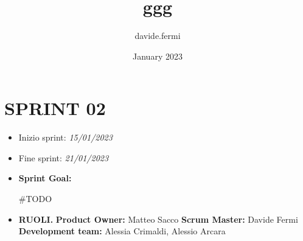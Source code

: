 \documentclass{article}
\title{ggg}
\author{davide.fermi }
\date{January 2023}
\begin{document}
    \maketitle

    \section{SPRINT 02}

    \begin{itemize}
        \item Inizio sprint: \textit{15/01/2023}
        \item Fine sprint: \textit{21/01/2023}
    \end{itemize}

    \begin{itemize}
        \item \textbf{Sprint Goal:}
        \begin{indent}
            \newline #TODO
        \end{indent}
    \end{itemize}

    \begin{itemize}
        \item \textbf{RUOLI.}
        \newline \textbf{Product Owner:} Matteo Sacco
        \newline \textbf{Scrum Master:} Davide Fermi
        \newline \textbf{Development team:} Alessia Crimaldi, Alessio Arcara
    \end{itemize}
\end{document}

